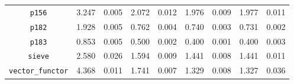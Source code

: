 \documentclass[12pt,a4paper,twoside,openright]{report}
\begin{document}
\begin{figure}[h]
\begin{tabular}{| c | c c | c c | c c | c c |}
\lstinline!p156!              & \cellcolor[hsb]{0.0,1.000,1}3.247 & 0.005 & \cellcolor[hsb]{0.0,0.511,1}2.072 & 0.012 & \cellcolor[hsb]{0.0,0.464,1}1.976 & 0.009 & \cellcolor[hsb]{0.0,0.465,1}1.977 & 0.011 \\
\lstinline!p182!              & \cellcolor[hsb]{0.0,0.368,1}1.928 & 0.005 & \cellcolor[hsb]{0.3,0.314,1}0.762 & 0.004 & \cellcolor[hsb]{0.3,0.334,1}0.740 & 0.003 & \cellcolor[hsb]{0.3,0.342,1}0.731 & 0.002 \\
\lstinline!p183!              & \cellcolor[hsb]{0.0,0.458,1}0.853 & 0.005 & \cellcolor[hsb]{0.0,0.062,1}0.500 & 0.002 & \cellcolor[hsb]{0.3,0.102,1}0.400 & 0.001 & \cellcolor[hsb]{0.3,0.102,1}0.400 & 0.003 \\
\lstinline!sieve!             & \cellcolor[hsb]{0.3,0.066,1}2.580 & 0.026 & \cellcolor[hsb]{0.3,0.423,1}1.594 & 0.009 & \cellcolor[hsb]{0.3,0.478,1}1.441 & 0.008 & \cellcolor[hsb]{0.3,0.478,1}1.441 & 0.011 \\
\lstinline!vector_functor!    & \cellcolor[hsb]{0.3,0.272,1}4.368 & 0.011 & \cellcolor[hsb]{0.3,0.710,1}1.741 & 0.007 & \cellcolor[hsb]{0.3,0.779,1}1.329 & 0.008 & \cellcolor[hsb]{0.3,0.779,1}1.327 & 0.036 \\
\hline
\end{tabular}


\end{figure}
\end{document}
